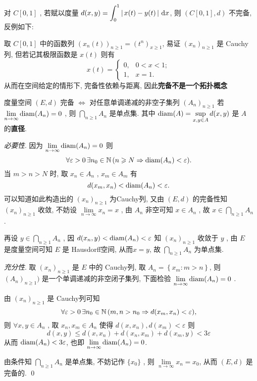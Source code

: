 \begin{Rmk}
     对 $ C[0, 1] $ , 若赋以度量 $ d(x, y)=\displaystyle\int_{0}^{1}\left| \,x(t)-y(t)\, \right| \,\mathrm{d} x $, 则 $ (C[0, 1], d) $ 不完备, 反例如下:

     取 $ C[0, 1] $ 中的函数列 $ (x_{n}(t))_{n\geqslant1}=(t^{n})_{x\geqslant1} $, 易证  $ (x_{n})_{n\geqslant1} $ 是 Cauchy列, 但若记其极限函数是 $ x(t) $ 则有
     \[
          x(t)=\begin{cases}
               0, & 0<x<1; \\
               1, & x=1. 
          \end{cases}
     \]
     从而在空间给定的情形下, 完备性依赖与距离, 因此\textbf{完备不是一个拓扑概念}
\end{Rmk}
\begin{Thm}
     度量空间 $ (E, d) $ 完备 $ \Leftrightarrow $ 对任意单调递减的非空子集列 $ (A_{n})_{n\geqslant1} $ 若 $ \lim\limits_{n\to\infty}\operatorname{diam}(A_{n})=0 $ , 则 $ \bigcap\limits_{n\geqslant1}A_{n} $ 是单点集. 其中 $ \operatorname{diam}(A)=\sup\limits_{x,y\in A}d(x, y) $ 是 $ A $  的\textbf{直径}. 
\end{Thm}
\begin{Prf}
     \textit{必要性}. 因为 $ \lim\limits_{n\to\infty}\operatorname{diam}(A_{n})=0 $ 则
     \[
          \forall \varepsilon>0\,\exists n_{0}\in\mathbb{N}\,(n\geqslant N\Rightarrow \operatorname{diam}(A_{n})<\varepsilon). 
     \]
     当 $ m>n>N $ 时, 取 $ x_{n}\in A_{n} $ , $ x_{m}\in A_{m} $ 有
     \[
          d(x_{m}, x_{n})<\operatorname{diam}(A_{n})<\varepsilon. 
     \]
     可以知道如此构造出的 $ (x_{n})_{n\geqslant1} $ 为Cauchy列, 又由 $ (E, d) $ 的完备性知 $ (x_{n})_{n\geqslant1} $ 收敛, 不妨设 $\lim\limits_{n\to\infty}x_{n}=x$ , 由 $ A_{n} $ 非空可知 $ x\in A_{n} $ , 故 $ x\in\bigcap\limits_{n\geqslant1}A_{n} $ . 

     再设 $ y\in\bigcap\limits_{n\geqslant1} A_{n} $ , 因 $ d(x_{n}, y)<\operatorname{diam}(A_{n})<\varepsilon $ 知 $ (x_{n})_{n\geqslant1} $ 收敛于 $ y $ , 由 $ E $ 是度量空间可知 $ E $ 是 Hausdorff空间, 从而$ x=y $, 故 $ \bigcap\limits_{n\geqslant1} A_{n} $ 为单点集. 

     \textit{充分性}. 取 $ (x_{n})_{n\geqslant1} $ 是 $ E $ 中的 Cauchy列, 取 $ A_{n}=\left\{ x_{m}:m>n \right\} $, 则 $ (A_{n})_{n\geqslant1}) $ 是一个单调递减的非空闭子集列, 下面检验 $ \lim\limits_{n\to\infty}\operatorname{diam}(A_{n})=0 $ . 

     由 $ (x_{n})_{n\geqslant1} $ 是 Cauchy列可知
     \[
           \forall \varepsilon>0\, \exists n_{0}\in\mathbb{N}\,(m, n>n_{0}\Rightarrow d(x_{m}, x_{n})<\varepsilon),
     \]
     则 $ \forall x, y\in A_{n} $ , 取 $ x_{n}, x_{m}\in A_{n} $ 使得 $ d(x, x_{n}), d(x_{m})<\varepsilon $ 则
     \[
          d(x, y)\leqslant d(x, x_{n})+d(x_{n}, x_{m})+d(x_{m}, y) < 3\varepsilon         
     \]
     从而 $ \operatorname{diam}(A_{n})<3\varepsilon $, 也即 $\lim\limits_{n\to\infty} \operatorname{diam}(A_{n})=0 $. 

     由条件知 $ \bigcap\limits_{n\geqslant1}A_{n} $ 是单点集, 不妨记作 $ \{ x_{0} \} $ , 则 $ \lim\limits_{n\to\infty}x_{n}=x_{0} $, 从而 $ (E, d) $  是完备的. \qed
\end{Prf}
